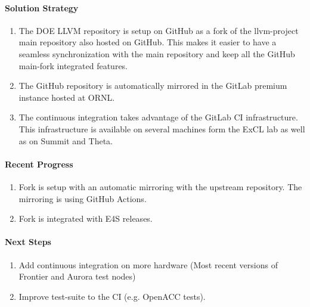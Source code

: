 \paragraph{Solution Strategy}

\begin{enumerate}

\item The DOE LLVM repository is setup on GitHub as a fork of the llvm-project
      main repository also hosted on GitHub. This makes it easier to have a
      seamless synchronization with the main repository and keep all the
      GitHub main-fork integrated features.

\item The GitHub repository is automatically mirrored in the GitLab premium
      instance hosted at ORNL.

\item The continuous integration takes advantage of the GitLab CI infrastructure.
      This infrastructure is available on several machines form the ExCL lab as
      well as on Summit and Theta.

\end{enumerate}


\paragraph{Recent Progress}

\begin{enumerate}
\item Fork is setup with an automatic mirroring with the upstream repository.
      The mirroring is using GitHub Actions.

\item Fork is integrated with E4S releases.
\end{enumerate}


\paragraph{Next Steps}

\begin{enumerate}
\item Add continuous integration on more hardware (Most recent versions of Frontier and Aurora test nodes)
\item Improve test-suite to the CI (e.g. OpenACC tests).
\end{enumerate}
